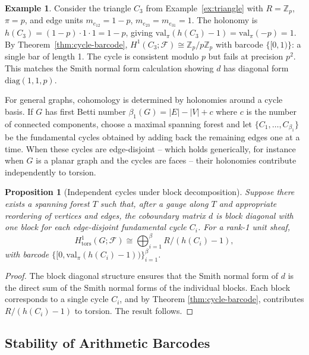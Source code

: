 \documentclass[11pt]{amsart}
\theoremstyle{plain}
\newtheorem{proposition}[theorem]{Proposition}
\theoremstyle{definition}
\newtheorem{example}[theorem]{Example}
\newcommand{\Zp}{\mathbb{Z}_p}                        %
\newcommand{\valpi}{\mathrm{val}_{\unif}}                   %
\newcommand{\Ring}{R}                          %
\newcommand{\unif}{\pi}                        %
\newcommand{\sheaf}[1]{\mathcal{#1}}                  %
\newcommand{\tors}{\mathrm{tors}}
\newcommand{\coboundary}{d}                           %
\begin{document}
\begin{example}
\label{ex:triangle-holonomy}
Consider the triangle $C_3$ from Example~\ref{ex:triangle} with $\Ring = \Zp$, $\unif = p$, and edge units $m_{e_{12}} = 1-p$, $m_{e_{23}} = m_{e_{31}} = 1$. The holonomy is $h(C_3) = (1-p) \cdot 1 \cdot 1 = 1-p$, giving $\valpi(h(C_3)-1) = \valpi(-p) = 1$. By Theorem~\ref{thm:cycle-barcode}, $H^1(C_3;\sheaf{F}) \cong \Zp/p\Zp$ with barcode $\{[0,1)\}$: a single bar of length 1. The cycle is consistent modulo $p$ but fails at precision $p^2$. This matches the Smith normal form calculation showing $\coboundary$ has diagonal form $\mathrm{diag}(1,1,p)$.
\end{example}

For general graphs, cohomology is determined by holonomies around a cycle basis. If $G$ has first Betti number $\beta_1(G) = |E| - |V| + c$ where $c$ is the number of connected components, choose a maximal spanning forest and let $\{C_1, \ldots, C_{\beta_1}\}$ be the fundamental cycles obtained by adding back the remaining edges one at a time. When these cycles are edge-disjoint -- which holds generically, for instance when $G$ is a planar graph and the cycles are faces -- their holonomies contribute independently to torsion.

\begin{proposition}[Independent cycles under block decomposition]
\label{prop:independent-cycles}
Suppose there exists a spanning forest $T$ such that, after a gauge along $T$ and appropriate reordering of vertices and edges, the coboundary matrix $\coboundary$ is block diagonal with one block for each edge-disjoint fundamental cycle $C_i$. For a rank-1 unit sheaf,
\[
H^1_{\tors}(G;\sheaf{F}) \cong \bigoplus_{i=1}^\beta \Ring/(h(C_i)-1),
\]
with barcode $\{[0, \valpi(h(C_i)-1))\}_{i=1}^\beta$.
\end{proposition}

\begin{proof}
The block diagonal structure ensures that the Smith normal form of $\coboundary$ is the direct sum of the Smith normal forms of the individual blocks. Each block corresponds to a single cycle $C_i$, and by Theorem \ref{thm:cycle-barcode}, contributes $\Ring/(h(C_i)-1)$ to torsion. The result follows.
\end{proof}

\subsection{Stability of Arithmetic Barcodes}
\label{ssec:barcode-stability}
\end{document}
